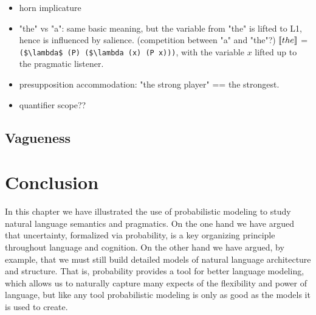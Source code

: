 \documentclass[12pt]{article}
\newcommand{\llbracket}{\ensuremath{\left [\!\left [}}%
\newcommand{\rrbracket}{\ensuremath{\right ]\!\right ]}}
\providecommand{\sv}[1]{\ensuremath{\llbracket #1 \rrbracket}}
\begin{document}


\begin{itemize}
\item horn implicature
\item  "the" vs "a": same basic meaning, but the variable from "the" is lifted to L1, hence is influenced by salience. (competition between "a" and "the"?)
\subitem \sv{the} = \lstinline{($\lambda$ (P) ($\lambda (x) (P x)))}, with the variable $x$ lifted up to the pragmatic listener. 
\item  presupposition accommodation: "the strong player" == the strongest.
\item quantifier scope??
\end{itemize}

\subsection{Vagueness}









\section{Conclusion}

In this chapter we have illustrated the use of probabilistic modeling to study natural language semantics and pragmatics. On the one hand we have argued that uncertainty, formalized via probability, is a key organizing principle throughout language and cognition. On the other hand we have argued, by example, that we must still build detailed models of natural language architecture and structure. That is, probability provides a tool for better language modeling, which allows us to naturally capture many expects of the flexibility and power of language, but like any tool probabilistic modeling is only as good as the models it is used to create.
\end{document}
